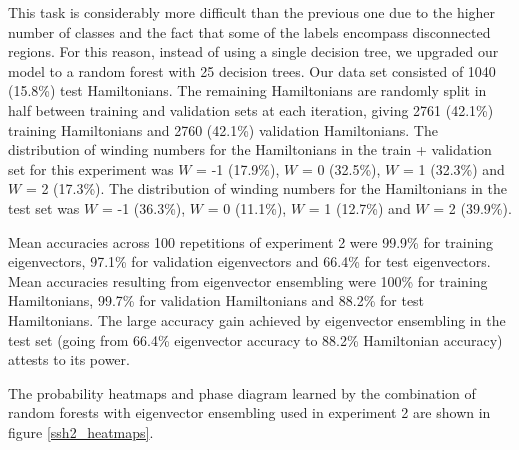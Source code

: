 \documentclass[10pt]{revtex4-1}
\begin{document}
This task is considerably more difficult than the previous one due to the higher number of classes and the fact that some of the labels encompass disconnected regions. For this reason, instead of using a single decision tree, we upgraded our model to a random forest \cite{Breiman2001} with 25 decision trees. Our data set consisted of 1040 (15.8\%) test Hamiltonians. The remaining Hamiltonians are randomly split in half between training and validation sets at each iteration, giving 2761 (42.1\%) training Hamiltonians and 2760 (42.1\%) validation Hamiltonians. The distribution of winding numbers for the Hamiltonians in the train + validation set for this experiment was $W$ = -1 (17.9\%), $W$ = 0 (32.5\%), $W$ = 1 (32.3\%) and $W$ = 2 (17.3\%). The distribution of winding numbers for the Hamiltonians in the test set was $W$ = -1 (36.3\%), $W$ = 0 (11.1\%), $W$ = 1 (12.7\%) and $W$ = 2 (39.9\%).

Mean accuracies across 100 repetitions of experiment 2 were 99.9\% for training eigenvectors, 97.1\% for validation eigenvectors and 66.4\% for test eigenvectors. Mean accuracies resulting from eigenvector ensembling were 100\% for training Hamiltonians, 99.7\% for validation Hamiltonians and 88.2\% for test Hamiltonians. The large accuracy gain achieved by eigenvector ensembling in the test set (going from 66.4\% eigenvector accuracy to 88.2\% Hamiltonian accuracy) attests to its power.

The probability heatmaps and phase diagram learned by the combination of random forests with eigenvector ensembling used in experiment 2 are shown in figure \ref{ssh2_heatmaps}.
\end{document}
